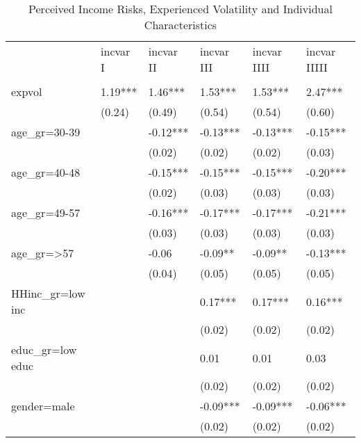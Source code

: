 
\begin{table}[p]
\centering
\begin{adjustbox}{width=\textwidth}
\begin{threeparttable}
\caption{Perceived Income Risks, Experienced Volatility and Individual Characteristics}
\label{micro_reg}\begin{tabular}{llllll}
\toprule
{} & incvar I & incvar II & incvar III & incvar IIII & incvar IIIII \\
                 &          &           &            &             &              \\
\midrule
expvol           &  1.19*** &   1.46*** &    1.53*** &     1.53*** &      2.47*** \\
                 &   (0.24) &    (0.49) &     (0.54) &      (0.54) &       (0.60) \\
age\_gr=30-39     &          &  -0.12*** &   -0.13*** &    -0.13*** &     -0.15*** \\
                 &          &    (0.02) &     (0.02) &      (0.02) &       (0.03) \\
age\_gr=40-48     &          &  -0.15*** &   -0.15*** &    -0.15*** &     -0.20*** \\
                 &          &    (0.02) &     (0.03) &      (0.03) &       (0.03) \\
age\_gr=49-57     &          &  -0.16*** &   -0.17*** &    -0.17*** &     -0.21*** \\
                 &          &    (0.03) &     (0.03) &      (0.03) &       (0.03) \\
age\_gr=>57       &          &     -0.06 &    -0.09** &     -0.09** &     -0.13*** \\
                 &          &    (0.04) &     (0.05) &      (0.05) &       (0.05) \\
HHinc\_gr=low inc &          &           &    0.17*** &     0.17*** &      0.16*** \\
                 &          &           &     (0.02) &      (0.02) &       (0.02) \\
educ\_gr=low educ &          &           &       0.01 &        0.01 &         0.03 \\
                 &          &           &     (0.02) &      (0.02) &       (0.02) \\
gender=male      &          &           &   -0.09*** &    -0.09*** &     -0.06*** \\
                 &          &           &     (0.02) &      (0.02) &       (0.02) \\

\end{tabular}
\end{threeparttable}
\end{adjustbox}
\end{table}
